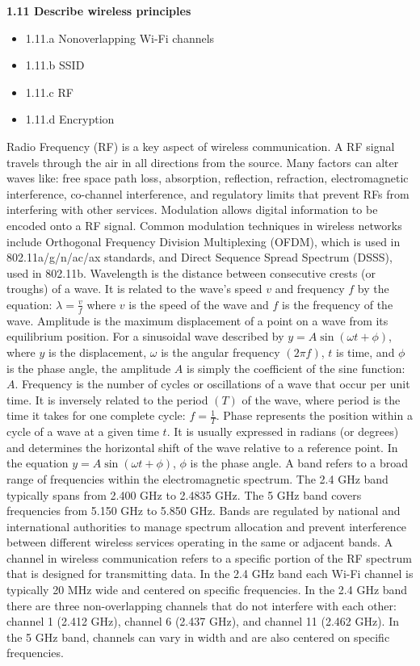 \documentclass{article}
\begin{document}
\textbf{1.11 Describe wireless principles}
\begin{itemize}
\item 1.11.a Nonoverlapping Wi-Fi channels
\item 1.11.b SSID
\item 1.11.c RF
\item 1.11.d Encryption
\end{itemize}
  
	Radio Frequency (RF) is a key aspect of wireless communication. A RF signal travels through the air in all directions from the source. Many factors can alter waves like: free space path loss, absorption, reflection, refraction, electromagnetic interference, co-channel interference, and regulatory limits that prevent RFs from interfering with other services. Modulation allows digital information to be encoded onto a RF signal. Common modulation techniques in wireless networks include Orthogonal Frequency Division Multiplexing (OFDM), which is used in 802.11a/g/n/ac/ax standards, and Direct Sequence Spread Spectrum (DSSS), used in 802.11b. Wavelength is the distance between consecutive crests (or troughs) of a wave. It is related to the wave's speed $v$ and frequency $f$ by the equation: $\lambda = \frac{v}{f}$ where $v$ is the speed of the wave and $f$ is the frequency of the wave. Amplitude is the maximum displacement of a point on a wave from its equilibrium position. For a sinusoidal wave described by $y = A \sin(\omega t + \phi)$, where $y$ is the displacement, $\omega$ is the angular frequency $(2\pi f)$, $t$ is time, and $\phi$ is the phase angle, the amplitude $A$ is simply the coefficient of the sine function: $A$. Frequency is the number of cycles or oscillations of a wave that occur per unit time. It is inversely related to the period $(T)$ of the wave, where period is the time it takes for one complete cycle: $f = \frac{1}{T}$. Phase represents the position within a cycle of a wave at a given time $t$. It is usually expressed in radians (or degrees) and determines the horizontal shift of the wave relative to a reference point. In the equation $y = A \sin(\omega t + \phi)$, $\phi$ is the phase angle. A band refers to a broad range of frequencies within the electromagnetic spectrum. The 2.4 GHz band typically spans from 2.400 GHz to 2.4835 GHz. The 5 GHz band covers frequencies from 5.150 GHz to 5.850 GHz. Bands are regulated by national and international authorities to manage spectrum allocation and prevent interference between different wireless services operating in the same or adjacent bands. A channel in wireless communication refers to a specific portion of the RF spectrum that is designed for transmitting data. In the 2.4 GHz band each Wi-Fi channel is typically 20 MHz wide and centered on specific frequencies. In the 2.4 GHz band there are three non-overlapping channels that do not interfere with each other: channel 1 (2.412 GHz), channel 6 (2.437 GHz), and channel 11 (2.462 GHz). In the 5 GHz band, channels can vary in width and are also centered on specific frequencies.
\end{document}
